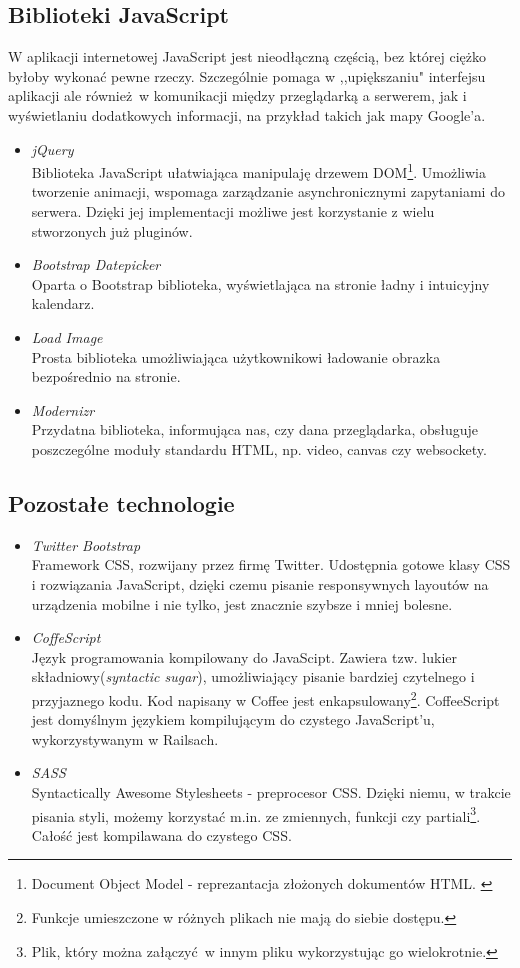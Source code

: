   \subsection{Biblioteki JavaScript}
    W aplikacji internetowej JavaScript jest nieodłączną częścią, bez której ciężko byłoby wykonać pewne rzeczy. Szczególnie pomaga w ,,upiększaniu" interfejsu aplikacji ale również w komunikacji między przeglądarką a serwerem, jak i wyświetlaniu dodatkowych informacji, na przykład takich jak mapy Google'a.

    \begin{itemize}
      \item \emph{jQuery} \\ Biblioteka JavaScript ułatwiająca manipulaję drzewem DOM\footnote{Document Object Model - reprezantacja złożonych dokumentów HTML. \cite{html5_css3}}. Umożliwia tworzenie animacji, wspomaga zarządzanie asynchronicznymi zapytaniami do serwera. Dzięki jej implementacji możliwe jest korzystanie z wielu stworzonych już pluginów.
      \item \emph{Bootstrap Datepicker} \\ Oparta o Bootstrap biblioteka, wyświetlająca na stronie ładny i intuicyjny kalendarz.
      \item \emph{Load Image} \\ Prosta biblioteka umożliwiająca użytkownikowi ładowanie obrazka bezpośrednio na stronie.
      \item \emph{Modernizr} \\ Przydatna biblioteka, informująca nas, czy dana przeglądarka, obsługuje poszczególne moduły standardu HTML, np. video, canvas czy websockety.
    \end{itemize}
  \subsection{Pozostałe technologie}
    \begin{itemize}
      \item \emph{Twitter Bootstrap} \\ Framework CSS, rozwijany przez firmę Twitter. Udostępnia gotowe klasy CSS i rozwiązania JavaScript, dzięki czemu pisanie responsywnych layoutów na urządzenia mobilne i nie tylko, jest znacznie szybsze i mniej bolesne.
      \item \emph{CoffeScript} \\ Język programowania kompilowany do JavaScipt. Zawiera tzw. lukier składniowy(\emph{syntactic sugar}), umożliwiający pisanie bardziej czytelnego i przyjaznego kodu. Kod napisany w Coffee jest enkapsulowany\footnote{Funkcje umieszczone w różnych plikach nie mają do siebie dostępu.}. CoffeeScript jest domyślnym językiem kompilującym do czystego JavaScript'u, wykorzystywanym w Railsach.
      \item \emph{SASS} \\ Syntactically Awesome Stylesheets - preprocesor CSS. Dzięki niemu, w trakcie pisania styli, możemy korzystać m.in. ze zmiennych, funkcji czy partiali\footnote{Plik, który można załączyć w innym pliku wykorzystując go wielokrotnie.}. Całość jest kompilawana do czystego CSS.
    \end{itemize}
